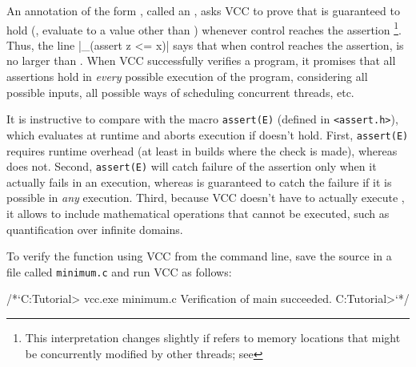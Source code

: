 An annotation of the form , called an , asks VCC to prove that
 is guaranteed to hold (\ie, evaluate to a value other than )
whenever control reaches the assertion%
\footnote{
  This interpretation changes slightly if  refers to
  memory locations that might be concurrently modified by other
  threads; see }.  
Thus, the line \vcc|_(assert z <= x)| says
that when control reaches the assertion,  is no larger than .
When VCC successfully verifies a program, it promises that all assertions
hold in \emph{every} possible execution of the program, considering all possible inputs,
all possible ways of scheduling concurrent threads, etc. 

It is instructive to compare  with the macro
\lstinline|assert(E)| (defined in \lstinline|<assert.h>|), which
evaluates   at runtime and aborts execution if 
doesn't hold. First, \lstinline|assert(E)| requires runtime overhead (at least
in builds where the check is made), whereas  does
not. Second, \lstinline|assert(E)| will catch failure of the 
assertion only when it actually fails in an execution, whereas 
 is guaranteed to catch the failure if it is
possible in \emph{any} execution. Third, because VCC doesn't have to
actually execute , it allows  to include
mathematical operations that cannot be executed, such as
quantification over infinite domains.

To verify the function using VCC from the command line, save the source in a file called \lstinline|minimum.c|
and run VCC as follows:

\begin{VCC}
/*`C:\Somewhere\VCC Tutorial> vcc.exe minimum.c
Verification of main succeeded.
C:\Somewhere\VCC Tutorial>`*/
\end{VCC}


